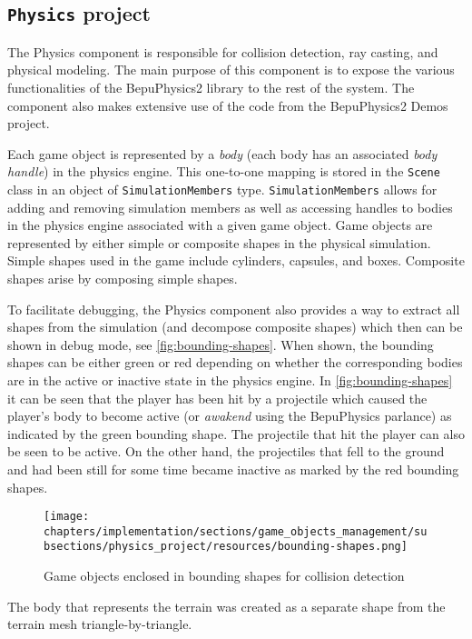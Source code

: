 \subsection{\texttt{Physics} project}\label{subsec:physics-project}
The Physics component is responsible for collision detection, ray casting, and physical modeling.
The main purpose of this component is to expose the various functionalities of the BepuPhysics2 library to the rest of the system.
The component also makes extensive use of the code from the BepuPhysics2 Demos project.

Each game object is represented by a \textit{body} (each body has an associated \textit{body handle}) in the physics engine.
This one-to-one mapping is stored in the \texttt{Scene} class in an object of \texttt{SimulationMembers} type.
\texttt{SimulationMembers} allows for adding and removing simulation members as well as accessing handles to bodies in the physics engine associated with a given game object.
Game objects are represented by either simple or composite shapes in the physical simulation.
Simple shapes used in the game include cylinders, capsules, and boxes.
Composite shapes arise by composing simple shapes.

To facilitate debugging, the Physics component also provides a way to extract all shapes from the simulation (and decompose composite shapes) which then can be shown in debug mode, see \autoref{fig:bounding-shapes}.
When shown, the bounding shapes can be either green or red depending on whether the corresponding bodies are in the active or inactive state in the physics engine.
In \autoref{fig:bounding-shapes} it can be seen that the player has been hit by a projectile which caused the player's body to become active (or \textit{awakend} using the BepuPhysics parlance) as indicated by the green bounding shape.
The projectile that hit the player can also be seen to be active.
On the other hand, the projectiles that fell to the ground and had been still for some time became inactive as marked by the red bounding shapes.
\begin{figure}[!htb]
    \centering
    \texttt{[image: chapters/implementation/sections/game\_objects\_management/subsections/physics\_project/resources/bounding-shapes.png]}
    \caption{Game objects enclosed in bounding shapes for collision detection}
    \label{fig:bounding-shapes}
\end{figure}

The body that represents the terrain was created as a separate shape from the terrain mesh triangle-by-triangle.

